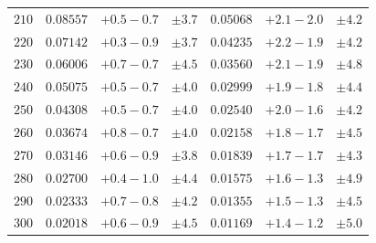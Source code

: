 \begin{table}
\begin{center}
\begin{tabular}{ccccccc}
$ 210 $ & $  0.08557 $ & $ +0.5   -\!0.7  $ & 
$ \pm 3.7 $
 & $  0.05068 $ & $ +2.1   -\!2.0  $ &
$ \pm 4.2 $ \\[.2em]

$ 220 $ & $  0.07142 $ & $ +0.3   -\!0.9  $ & 
$ \pm 3.7 $
 & $  0.04235 $ & $ +2.2   -\!1.9  $ &
$ \pm 4.2 $ \\[.2em]

$ 230 $ & $  0.06006 $ & $ +0.7   -\!0.7  $ & 
$ \pm 4.5 $
 & $  0.03560 $ & $ +2.1   -\!1.9  $ &
$ \pm 4.8 $ \\[.2em]

$ 240 $ & $  0.05075 $ & $ +0.5   -\!0.7  $ & 
$ \pm 4.0 $
 & $  0.02999 $ & $ +1.9   -\!1.8  $ &
$ \pm 4.4 $ \\[.2em]

$ 250 $ & $  0.04308 $ & $ +0.5   -\!0.7  $ & 
$ \pm 4.0 $
 & $  0.02540 $ & $ +2.0   -\!1.6  $ &
$ \pm 4.2 $ \\[.2em]

$ 260 $ & $  0.03674 $ & $ +0.8   -\!0.7  $ & 
$ \pm 4.0 $
 & $  0.02158 $ & $ +1.8   -\!1.7  $ &
$ \pm 4.5 $ \\[.2em]

$ 270 $ & $  0.03146 $ & $ +0.6   -\!0.9  $ & 
$ \pm 3.8 $
 & $  0.01839 $ & $ +1.7   -\!1.7  $ &
$ \pm 4.3 $ \\[.2em]

$ 280 $ & $  0.02700 $ & $ +0.4   -\!1.0  $ & 
$ \pm 4.4 $
 & $  0.01575 $ & $ +1.6   -\!1.3  $ &
$ \pm 4.9 $ \\[.2em]

$ 290 $ & $  0.02333 $ & $ +0.7   -\!0.8  $ & 
$ \pm 4.2 $
 & $  0.01355 $ & $ +1.5   -\!1.3  $ &
$ \pm 4.5 $ \\[.2em]

$ 300 $ & $  0.02018 $ & $ +0.6   -\!0.9  $ & 
$ \pm 4.5 $
 & $  0.01169 $ & $ +1.4   -\!1.2  $ &
$ \pm 5.0 $ \\[.2em]

   \hline
   \end{tabular}
   \end{center}
\end{table}

